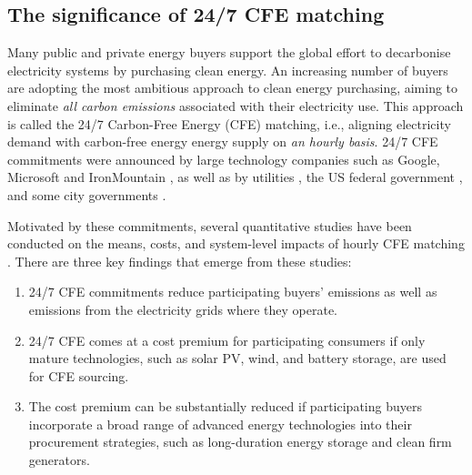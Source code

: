 \documentclass[pdflatex,sn-basic, Numbered]{sn-jnl}%
\theoremstyle{thmstyleone}%
\theoremstyle{thmstyletwo}%
\theoremstyle{thmstylethree}%
\begin{document}
\subsection*{The significance of 24/7 CFE matching}\label{sec2}

Many public and private energy buyers support the global effort to decarbonise electricity systems by purchasing clean energy.
An increasing number of buyers are adopting the most ambitious approach to clean energy purchasing, aiming to eliminate \textit{all carbon emissions} associated with their electricity use.
This approach is called the 24/7 Carbon-Free Energy (CFE) matching, i.e., aligning electricity demand with carbon-free energy energy supply on \textit{an hourly basis}.
24/7 CFE commitments were announced by large technology companies such as Google, Microsoft and IronMountain \cite{google-247by2030, Microsoft-vision, IronMountainSustainability}, as well as by utilities \cite{peninsula-OurPathto247}, the US federal government \cite{thewhitehouseExecutiveOrderCatalyzing2021}, and some city governments \cite{iowaenvcouncil-247}.

Motivated by these commitments, several quantitative studies have been conducted on the means, costs, and system-level impacts of hourly CFE matching \cite{xu-247CFE-report, ieaAdvancingDecarbonisationClean2022, riepin-zenodo-systemlevel247, riepinMeansCostsSystemlevel2024}. There are three key findings that emerge from these studies:
\begin{enumerate}
    \item 24/7 CFE commitments reduce participating buyers' emissions as well as emissions from the electricity grids where they operate.
    \item 24/7 CFE comes at a cost premium for participating consumers if only mature technologies, such as solar PV, wind, and battery storage, are used for CFE sourcing.
    \item The cost premium can be substantially reduced if participating buyers incorporate a broad range of advanced energy technologies into their procurement strategies, such as long-duration energy storage and clean firm generators.
\end{enumerate}
\end{document}
